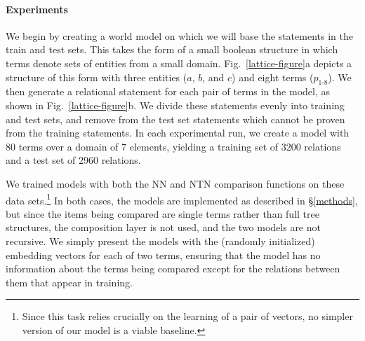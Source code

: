 

\paragraph{Experiments}
We begin by creating a world model
on which we will base the statements in the train and test sets.
This takes the form of a small boolean structure in which terms denote
sets of entities from a small domain.  Fig.~\ref{lattice-figure}a
depicts a structure of this form with three entities ($a$, $b$, and $c$) and eight terms ($p_{1\text{-}8}$). We then generate a 
relational statement for each pair of terms in the model, as shown in Fig.~\ref{lattice-figure}b. 
We divide these statements evenly into training and test sets, and remove from the
test set statements which cannot be proven from the training
statements.
In each experimental run, we create a model with 80 terms over a domain of 7 elements, yielding a training set of 3200 relations and a test set of 
2960 relations.

We trained models with both the NN and NTN comparison functions on these
data sets.\footnote{Since this task relies crucially on the learning of a pair of vectors, no simpler version of our model is a viable baseline.} In both cases, the models are implemented as
described in \S\ref{methods}, but since the items being compared
are single terms rather than full tree structures, the composition
layer is not used, and the two models are not recursive. We simply present
the models with the (randomly initialized) embedding vectors for each
of two terms, ensuring that the model has no information about the terms
being compared except for the relations between them that appear in training.


